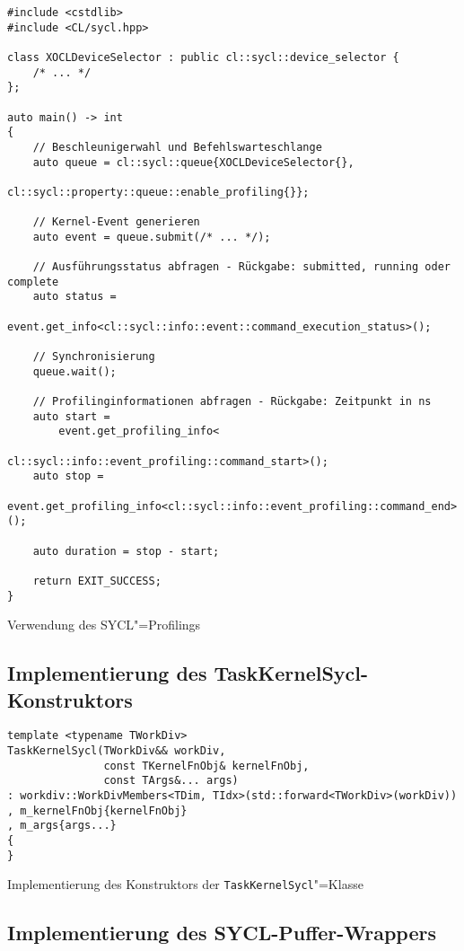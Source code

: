 \begin{code}
    \begin{verbatim}
#include <cstdlib>
#include <CL/sycl.hpp>

class XOCLDeviceSelector : public cl::sycl::device_selector {
    /* ... */
};

auto main() -> int
{
    // Beschleunigerwahl und Befehlswarteschlange
    auto queue = cl::sycl::queue{XOCLDeviceSelector{},
                                 cl::sycl::property::queue::enable_profiling{}};

    // Kernel-Event generieren
    auto event = queue.submit(/* ... */);

    // Ausführungsstatus abfragen - Rückgabe: submitted, running oder complete
    auto status =
        event.get_info<cl::sycl::info::event::command_execution_status>();

    // Synchronisierung
    queue.wait();

    // Profilinginformationen abfragen - Rückgabe: Zeitpunkt in ns
    auto start =
        event.get_profiling_info<
                            cl::sycl::info::event_profiling::command_start>();
    auto stop =
        event.get_profiling_info<cl::sycl::info::event_profiling::command_end>();

    auto duration = stop - start;

    return EXIT_SUCCESS;
}
    \end{verbatim}
    \caption{Verwendung des SYCL"=Profilings}
\end{code}

\subsection{Implementierung des TaskKernelSycl-Konstruktors}
\label{anhang:source:cpp:taskkernelsyclkonst}

\begin{code}
    \begin{verbatim}
template <typename TWorkDiv>
TaskKernelSycl(TWorkDiv&& workDiv,
               const TKernelFnObj& kernelFnObj,
               const TArgs&... args)
: workdiv::WorkDivMembers<TDim, TIdx>(std::forward<TWorkDiv>(workDiv))
, m_kernelFnObj{kernelFnObj}
, m_args{args...}
{
}
    \end{verbatim}
    \caption{Implementierung des Konstruktors der \texttt{TaskKernelSycl}"=Klasse}
\end{code}

\subsection{Implementierung des SYCL-Puffer-Wrappers}
\label{anhang:source:cpp:bufferwrapper}

